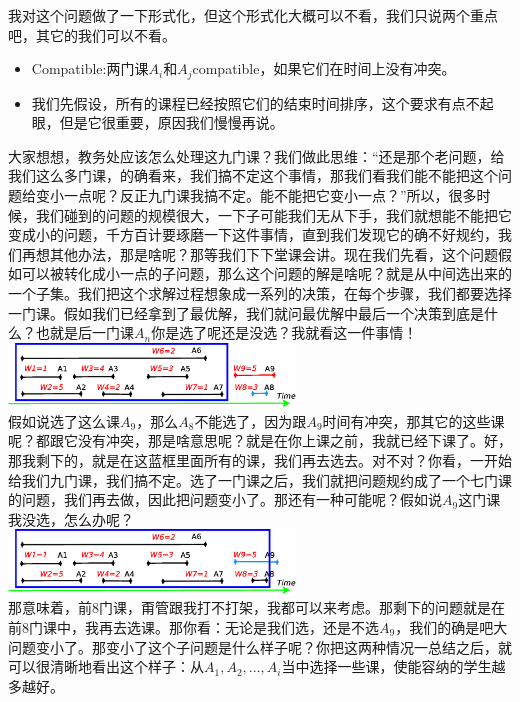	我对这个问题做了一下形式化，但这个形式化大概可以不看，我们只说两个重点吧，其它的我们可以不看。
	\begin{itemize}
		\item
		Compatible:两门课$A_i$和$A_j$compatible，如果它们在时间上没有冲突。
		\item
		我们先假设，所有的课程已经按照它们的结束时间排序，这个要求有点不起眼，但是它很重要，原因我们慢慢再说。
	\end{itemize}
	大家想想，教务处应该怎么处理这九门课？我们做此思维：“还是那个老问题，给我们这么多门课，的确看来，我们搞不定这个事情，那我们看我们能不能把这个问题给变小一点呢？反正九门课我搞不定。能不能把它变小一点？”所以，很多时候，我们碰到的问题的规模很大，一下子可能我们无从下手，我们就想能不能把它变成小的问题，千方百计要琢磨一下这件事情，直到我们发现它的确不好规约，我们再想其他办法，那是啥呢？那等我们下下堂课会讲。现在我们先看，这个问题假如可以被转化成小一点的子问题，那么这个问题的解是啥呢？就是从中间选出来的一个子集。我们把这个求解过程想象成一系列的决策，在每个步骤，我们都要选择一门课。假如我们已经拿到了最优解，我们就问最优解中最后一个决策到底是什么？也就是后一门课$A_n$你是选了呢还是没选？我就看这一件事情！\\
	 \includegraphics[width=3in] {L7-intervalschedulingexamplek1.eps}\\
	假如说选了这么课$A_9$，那么$A_8$不能选了，因为跟$A_9$时间有冲突，那其它的这些课呢？都跟它没有冲突，那是啥意思呢？就是在你上课之前，我就已经下课了。好，那我剩下的，就是在这蓝框里面所有的课，我们再去选去。对不对？你看，一开始给我们九门课，我们搞不定。选了一门课之后，我们就把问题规约成了一个七门课的问题，我们再去做，因此把问题变小了。那还有一种可能呢？假如说$A_9$这门课我没选，怎么办呢？\\
	 \includegraphics[width=3in] {L7-intervalschedulingexamplek2.eps}\\
	 那意味着，前8门课，甭管跟我打不打架，我都可以来考虑。那剩下的问题就是在前8门课中，我再去选课。那你看：无论是我们选，还是不选$A_9$，我们的确是吧大问题变小了。那变小了这个子问题是什么样子呢？你把这两种情况一总结之后，就可以很清晰地看出这个样子：从$A_1,A_2,…,A_i$当中选择一些课，使能容纳的学生越多越好。
	

